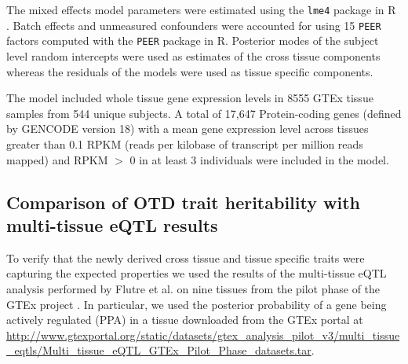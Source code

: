 \documentclass[10pt,letterpaper]{article}
\begin{document}

The mixed effects model parameters were estimated using the \texttt{lme4} package \cite{Bates_2015a} in R \cite{R_Core_Team_2015}. Batch effects and unmeasured confounders were accounted for using 15 \texttt{PEER} factors computed with the \texttt{PEER} \cite{Stegle_2012} package in R. Posterior modes of the subject level random intercepts were used as estimates of the cross tissue components whereas the residuals of the models were used as tissue specific components.

The model included whole tissue gene expression levels in 8555 GTEx
tissue samples from 544 unique subjects. A total of 17,647
Protein-coding genes (defined by GENCODE \cite{Harrow_2012} version 18) with a
mean gene expression level across tissues greater than 0.1 RPKM (reads
per kilobase of transcript per million reads mapped) and RPKM $>$ 0 in at least 3 individuals were included in
the model. 


\subsection*{Comparison of OTD trait heritability with multi-tissue eQTL
results}\label{comparison-of-otd-pve-to-multi-tissue-eqtl-results}

To verify that the newly derived cross tissue and tissue specific traits were capturing the expected properties we used the results of the multi-tissue eQTL analysis performed by Flutre et al. \cite{Flutre_2013}
on nine tissues from the pilot phase of the GTEx project \cite{Ardlie_2015}. %
In particular, we used the posterior probability of a gene being actively regulated (PPA) in a tissue downloaded from the GTEx portal at \url{http://www.gtexportal.org/static/datasets/gtex_analysis_pilot_v3/multi_tissue_eqtls/Multi_tissue_eQTL_GTEx_Pilot_Phase_datasets.tar}.
\end{document}
